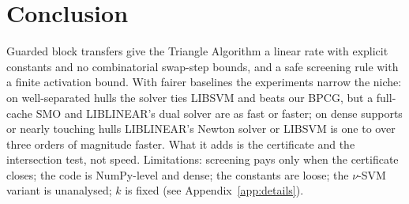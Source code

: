 \documentclass{opt2026}   %
\begin{document}
\section{Conclusion}
Guarded block transfers give the Triangle Algorithm a linear rate with
explicit constants and no combinatorial swap-step bounds, and a safe
screening rule with a finite activation bound. With fairer baselines the
experiments narrow the niche: on well-separated hulls the solver ties
LIBSVM and beats our BPCG, but a full-cache SMO and LIBLINEAR's dual solver are as
fast or faster; on dense supports or nearly touching hulls LIBLINEAR's
Newton solver or LIBSVM is one to over three orders of magnitude faster. What
it adds is the certificate and the intersection test, not speed. Limitations: screening pays only when the certificate closes; the code
is NumPy-level and dense; the constants are loose; the $\nu$-SVM
variant is unanalysed; $k$ is fixed (see Appendix~\ref{app:details}).
\end{document}

